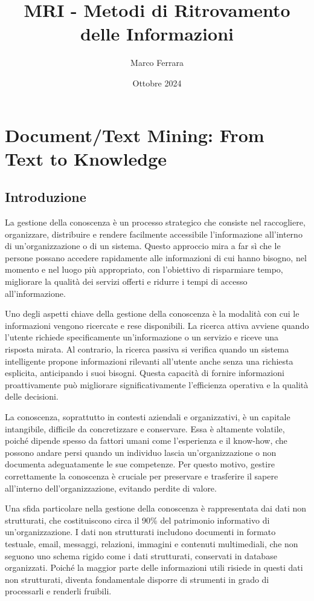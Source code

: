\documentclass{report}
\title{MRI - Metodi di Ritrovamento delle Informazioni}
\author{Marco Ferrara}
\date{Ottobre 2024}
\begin{document}
	\maketitle
	\tableofcontents
	\newpage
	
	\chapter{Document/Text Mining: From Text to Knowledge}
	\section{Introduzione}
	La gestione della conoscenza è un processo strategico che consiste nel raccogliere, organizzare, distribuire e rendere facilmente accessibile l'informazione all'interno di un'organizzazione o di un sistema. Questo approccio mira a far sì che le persone possano accedere rapidamente alle informazioni di cui hanno bisogno, nel momento e nel luogo più appropriato, con l'obiettivo di risparmiare tempo, migliorare la qualità dei servizi offerti e ridurre i tempi di accesso all'informazione.

	Uno degli aspetti chiave della gestione della conoscenza è la modalità con cui le informazioni vengono ricercate e rese disponibili. La ricerca attiva avviene quando l'utente richiede specificamente un'informazione o un servizio e riceve una risposta mirata. Al contrario, la ricerca passiva si verifica quando un sistema intelligente propone informazioni rilevanti all'utente anche senza una richiesta esplicita, anticipando i suoi bisogni. Questa capacità di fornire informazioni proattivamente può migliorare significativamente l'efficienza operativa e la qualità delle decisioni.
	
	La conoscenza, soprattutto in contesti aziendali e organizzativi, è un capitale intangibile, difficile da concretizzare e conservare. Essa è altamente volatile, poiché dipende spesso da fattori umani come l'esperienza e il know-how, che possono andare persi quando un individuo lascia un'organizzazione o non documenta adeguatamente le sue competenze. Per questo motivo, gestire correttamente la conoscenza è cruciale per preservare e trasferire il sapere all'interno dell'organizzazione, evitando perdite di valore.
	
	Una sfida particolare nella gestione della conoscenza è rappresentata dai dati non strutturati, che costituiscono circa il 90\% del patrimonio informativo di un'organizzazione. I dati non strutturati includono documenti in formato testuale, email, messaggi, relazioni, immagini e contenuti multimediali, che non seguono uno schema rigido come i dati strutturati, conservati in database organizzati. Poiché la maggior parte delle informazioni utili risiede in questi dati non strutturati, diventa fondamentale disporre di strumenti in grado di processarli e renderli fruibili.
	
\end{document}
